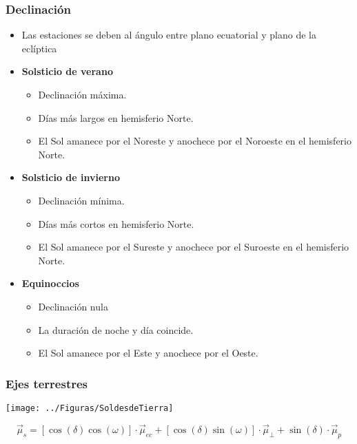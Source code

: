 \documentclass[xcolor=dvipsnames]{beamer}
\begin{document}
\begin{frame}
  \frametitle{Declinación}
  \begin{itemize}
  \item Las estaciones se deben al ángulo entre plano ecuatorial y
    plano de la eclíptica
  \item \textbf{Solsticio de verano}

    \begin{itemize}
    \item Declinación máxima.
    \item Días más largos en hemisferio Norte.
    \item El Sol amanece por el Noreste y anochece por el Noroeste en
      el hemisferio Norte.
    \end{itemize}
  \item \textbf{Solsticio de invierno}

    \begin{itemize}
    \item Declinación mínima.
    \item Días más cortos en hemisferio Norte.
    \item El Sol amanece por el Sureste y anochece por el Suroeste en
      el hemisferio Norte.
    \end{itemize}
  \item \textbf{Equinoccios}

    \begin{itemize}
    \item Declinación nula
    \item La duración de noche y día coincide.
    \item El Sol amanece por el Este y anochece por el Oeste.
    \end{itemize}
  \end{itemize}



\end{frame}

\begin{frame}[plain]
  \frametitle{Ejes terrestres}

  \texttt{[image: ../Figuras/SoldesdeTierra]}

\[
\vec{\mu}_{s}=\left[\cos\left(\delta\right)\cos\left(\omega\right)\right]\cdot\vec{\mu}_{ec}+\left[\cos\left(\delta\right)\sin\left(\omega\right)\right]\cdot\vec{\mu}_{\bot}+\sin\left(\delta\right)\cdot\vec{\mu}_{p}\]



\end{frame}
\end{document}
